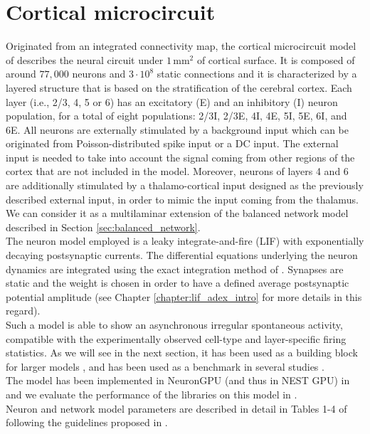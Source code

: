 \documentclass[a4paper, 12pt, twoside, openright]{book}
\begin{document}
\section{Cortical microcircuit}
\label{sec:cortical_microcircuit}
Originated from an integrated connectivity map, the cortical microcircuit model of \cite{Potjans2012} describes the neural circuit under $1$\,mm$^2$ of cortical surface. It is composed of around $77,000$ neurons and $3\cdot 10^8$ static connections and it is characterized by a layered structure that is based on the stratification of the cerebral cortex. Each layer (i.e., 2/3, 4, 5 or 6) has an excitatory (E) and an inhibitory (I) neuron population, for a total of eight populations: 2/3I, 2/3E, 4I, 4E, 5I, 5E, 6I, and 6E. All neurons are externally stimulated by a background input which can be originated from Poisson-distributed spike input or a DC input. The external input is needed to take into account  the signal coming from other regions of the cortex that are not included in the model. Moreover, neurons of layers 4 and 6 are additionally stimulated by a thalamo-cortical input designed as the previously described external input, in order to mimic the input coming from the thalamus. We can consider it as a multilaminar extension of the balanced network model described in Section \ref{sec:balanced_network}.\\
The neuron model employed is a leaky integrate-and-fire (LIF) with exponentially decaying postsynaptic currents. The differential equations underlying the neuron dynamics are integrated using the exact integration method of \cite{Rotter1999}. Synapses are static and the weight is chosen in order to have a defined average postsynaptic potential amplitude (see Chapter \ref{chapter:lif_adex_intro} for more details in this regard).\\
Such a model is able to show an asynchronous irregular spontaneous activity, compatible with the experimentally observed cell-type and layer-specific firing statistics. As we will see in the next section, it has been used as a building block for larger models \cite{Schmidt2018}, and has been used as a benchmark in several studies \cite{Knight2021, VanAlbada2018, Knight2018, Rhodes2019, Kurth2022, Heittmann2022}.\\
The model has been implemented in NeuronGPU (and thus in NEST GPU) in \cite{Golosio2021} and we evaluate the performance of the libraries on this model in \cite{Golosio2021, Golosio2023}.\\
Neuron and network model parameters are described in detail in Tables 1-4 of \cite{Dasbach2021} following the guidelines proposed in \cite{Nordlie2009}.
\end{document}
